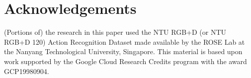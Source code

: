 \documentclass[sigconf,screen,prologue,table,dvipsnames]{acmart}
\begin{document}
\section{Acknowledgements}

(Portions of) the research in this paper used the NTU RGB+D (or NTU RGB+D 120) Action Recognition Dataset made available by the ROSE Lab at the Nanyang Technological University, Singapore. This material is based upon work supported by the Google Cloud Research Credits program with the award GCP19980904.



\end{document}
